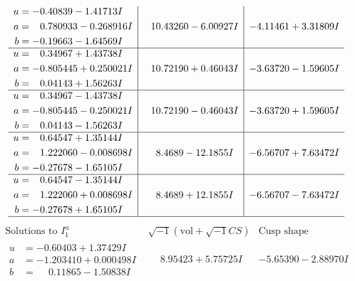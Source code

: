 \documentclass[1p]{elsarticle_modified}
\theoremstyle{definition}
\newcommand{\I}{\sqrt{-1}}
\begin{document}
$$\begin{array}{c|c|c}
\begin{aligned}
u &= -0.40839 - 1.41713 I \\
a &= \phantom{-}0.780933 - 0.268916 I \\
b &= -0.19663 - 1.64569 I\end{aligned}
 & \phantom{-}10.43260 - 6.00927 I & -4.11461 + 3.31809 I \\ \hline\begin{aligned}
u &= \phantom{-}0.34967 + 1.43738 I \\
a &= -0.805445 + 0.250021 I \\
b &= \phantom{-}0.04143 + 1.56263 I\end{aligned}
 & \phantom{-}10.72190 + 0.46043 I & -3.63720 - 1.59605 I \\ \hline\begin{aligned}
u &= \phantom{-}0.34967 - 1.43738 I \\
a &= -0.805445 - 0.250021 I \\
b &= \phantom{-}0.04143 - 1.56263 I\end{aligned}
 & \phantom{-}10.72190 - 0.46043 I & -3.63720 + 1.59605 I \\ \hline\begin{aligned}
u &= \phantom{-}0.64547 + 1.35144 I \\
a &= \phantom{-}1.222060 - 0.008698 I \\
b &= -0.27678 - 1.65105 I\end{aligned}
 & \phantom{-}8.4689 - 12.1855 I & -6.56707 + 7.63472 I \\ \hline\begin{aligned}
u &= \phantom{-}0.64547 - 1.35144 I \\
a &= \phantom{-}1.222060 + 0.008698 I \\
b &= -0.27678 + 1.65105 I\end{aligned}
 & \phantom{-}8.4689 + 12.1855 I & -6.56707 - 7.63472 I\\
 \hline 
 \end{array}$$\newpage$$\begin{array}{c|c|c}  
\text{Solutions to }I^u_{1}& \I (\text{vol} + \sqrt{-1}CS) & \text{Cusp shape}\\
 \hline 
\begin{aligned}
u &= -0.60403 + 1.37429 I \\
a &= -1.203410 + 0.000498 I \\
b &= \phantom{-}0.11865 - 1.50838 I\end{aligned}
 & \phantom{-}8.95423 + 5.75725 I & -5.65390 - 2.88970 I \\ \hline\begin{aligned}

\end{aligned}
\end{array}$$
\end{document}
